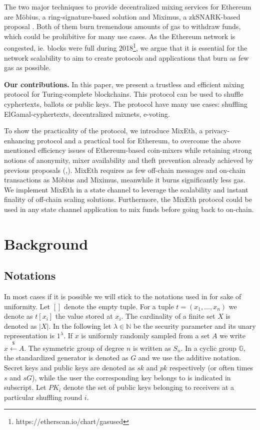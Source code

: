 \documentclass[conference, compsoc]{IEEEtran}
\theoremstyle{definition}
\begin{document}
The two major techniques to provide decentralized mixing services for Ethereum are Möbius, a ring-signature-based solution \cite{meiklejohn2018mobius} and Miximus, a zkSNARK-based proposal \cite{miximus2018}. Both of them burn tremendous amounts of gas to withdraw funds, which could be prohibitive for many use cases. As the Ethereum network is congested, ie. blocks were full during 2018\footnote{https://etherscan.io/chart/gasused}, we argue that it is essential for the network scalability to aim to create protocols and applications that burn as few gas as possible. 

\textbf{Our contributions.} In this paper, we present a trustless and efficient mixing protocol for Turing-complete blockchains. This protocol can be used to shuffle cyphertexts, ballots or public keys. The protocol have many use cases: shuffling ElGamal-cyphertexts, decentralized mixnets, e-voting.

To show the practicality of the protocol, we introduce MixEth, a privacy-enhancing protocol and a practical tool for Ethereum, to overcome the above mentioned efficiency issues of Ethereum-based coin-mixers while retaining strong notions of anonymity, mixer availability and theft prevention already achieved by previous proposals (\cite{meiklejohn2018mobius},\cite{miximus2018}). MixEth requires as few off-chain messages and on-chain transactions as Möbius and Miximus, meanwhile it burns significantly less gas. We implement MixEth in a state channel to leverage the scalability and instant finality of off-chain scaling solutions. Furthermore, the MixEth protocol could be used in any state channel application to mix funds before going back to on-chain.

\section{Background}
\subsection{Notations}
In most cases if it is possible we will stick to the notations used in \cite{meiklejohn2018mobius} for sake of uniformity. 
Let $[]$ denote the empty tuple. For a tuple $t=(x_1,\dots,x_n)$ we denote as $t[x_i]$ the value stored at $x_{i}$. The cardinality of a finite set $X$ is denoted as $|X|$. In the following let $\lambda \in \mathbb{N}$ be the security parameter and its unary representation is $1^{\lambda}$. If $x$ is uniformly randomly sampled from a set $A$ we write $x\stackrel{\$}{\leftarrow}A$. The symmetric group of degree $n$ is written as ${S}_n$. In a cyclic group $\mathbb{G}$, the standardized generator is denoted as $G$ and we use the additive notation. Secret keys and public keys are denoted as $sk$ and $pk$ respectively (or often times $s$ and $sG$), while the user the corresponding key belongs to is indicated in subscript. Let $PK_{i}$ denote the set of public keys belonging to receivers at a particular shuffling round $i$.
\end{document}

